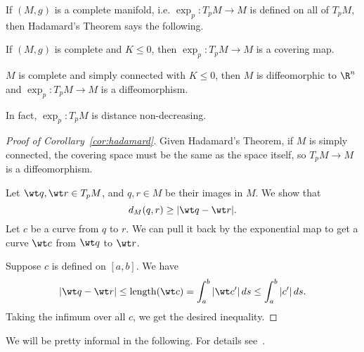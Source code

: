 If $(M,g)$ is a complete manifold, i.e. $\exp_p:T_pM\to M$ is defined on all of $T_pM$, then Hadamard's Theorem says the following.
\begin{thm}[Hadamard]
If $(M,g)$ is complete and $K\le 0$, then $\exp_p:T_pM\to M$ is a covering map. 
\end{thm}
\begin{cor}
$M$ is complete and simply connected with $K\le 0$, then $M$ is diffeomorphic to $\R^n$ and $\exp_p:T_pM\to M$ is a diffeomorphism.

In fact, $\exp_p :T_pM$ is distance non-decreasing.
\end{cor}
\begin{proof}[Proof of Corollary~\ref{cor:hadamard}]
Given Hadamard's Theorem, if $M$ is simply connected, the covering space must be the same as the space itself, so $T_pM\to M$ is a diffeomorphism.

Let $\wt q,\wt r\in T_pM$, and $q,r\in M$ be their images in $M$. We show that
\[
d_M(q,r)\ge |\wt q-\wt r|.
\]
Let $c$ be a curve from $q$ to $r$. We can pull it back by the exponential map to get a curve $\wt c$ from $\wt q $ to $\wt r$.


Suppose $c$ is defined on $[a,b]$. We have
\[
|\wt q-\wt r|\le \text{length}(\wt c)=\int_a^b |\wt c'|\,ds \le \int_a^b |c'|\,ds.
\]
Taking the infimum over all $c$, we get the desired inequality.
\end{proof}

We will be pretty informal in the following. For details see~\cite[p. 149--151]{dC}.

